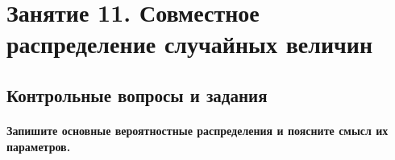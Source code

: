 \chapter*{Занятие 11. Совместное распределение случайных величин}

\section*{Контрольные вопросы и задания}

\subsubsection*{Запишите основные вероятностные распределения и поясните смысл их параметров.}

